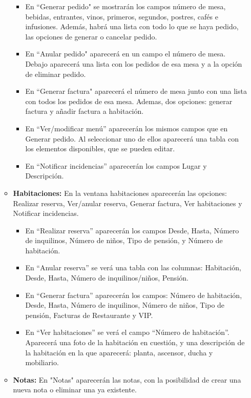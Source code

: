 \documentclass[spanish,a4paper,11pt, twoside]{report}	%
\begin{document}
\begin{itemize}
\begin{itemize}
\begin{itemize}
						\item En “Generar pedido" se mostrarán los campos número de mesa, bebidas, entrantes, vinos, primeros, segundos, postres, cafés e infusiones. Además, habrá una lista con todo lo que se haya pedido, las opciones de generar o cancelar pedido. 
						\item En “Anular pedido" aparecerá en un campo el número de mesa. Debajo aparecerá una lista con los pedidos de esa mesa y a la opción de eliminar pedido. 
						\item En “Generar factura" aparecerá el número de mesa junto con una lista con todos los pedidos de esa mesa. Ademas, dos opciones: generar factura y añadir factura a habitación.
						\item En “Ver/modificar menú'' aparecerán los mismos campos que en Generar pedido. Al seleccionar uno de ellos aparecerá una tabla con los elementos disponibles, que se pueden editar. 
						\item En “Notificar incidencias'' aparecerán los campos Lugar y Descripción.
					\end{itemize}
					
					 \item \textbf{Habitaciones:} En la ventana habitaciones aparecerán las opciones: Realizar reserva, Ver/anular reserva, Generar factura, Ver habitaciones y Notificar incidencias. 
					\begin{itemize}		
							\item En “Realizar reserva'' aparecerán los campos Desde, Hasta, Número de inquilinos, Número de niños, Tipo de pensión, y Número de habitación.
							\item En “Anular reserva'' se verá una tabla con las columnas: Habitación, Desde, Hasta, Número de inquilinos/niños, Pensión.\\
							\item En “Generar factura'' aparecerán los campos: Número de habitación, Desde, Hasta, Número de inquilinos, Número de niños, Tipo de pensión, Facturas de Restaurante y VIP. \\
							\item En “Ver habitaciones'' se verá el campo “Número de habitación''. Aparecerá una foto de la habitación en cuestión, y una descripción de la habitación en la que aparecerá: planta, ascensor, ducha y mobiliario. 
					\end{itemize}
					 \item \textbf{Notas:} En "Notas" aparecerán las notas, con la posibilidad de crear una nueva nota o eliminar una ya existente.
				\end{itemize}
				

\end{itemize}
\end{document}

